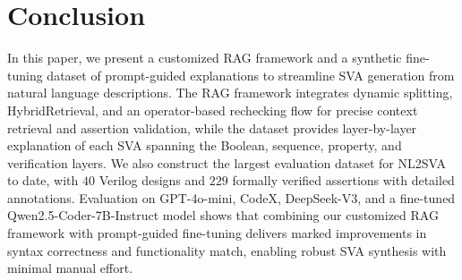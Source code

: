 \section{Conclusion} \label{sec:con}
In this paper, we present a customized RAG framework and a synthetic fine-tuning dataset of prompt-guided explanations to streamline SVA generation from natural language descriptions. The RAG framework integrates dynamic splitting, HybridRetrieval, and an operator-based rechecking flow for precise context retrieval and assertion validation, while the dataset provides layer-by-layer explanation of each SVA spanning the Boolean, sequence, property, and verification layers. 
We also construct the largest evaluation dataset for NL2SVA to date, with $40$ Verilog designs and $229$ formally verified assertions with detailed annotations.
Evaluation on GPT-4o-mini, CodeX, DeepSeek-V3, and a fine-tuned Qwen2.5-Coder-7B-Instruct model shows that combining our customized RAG framework with prompt-guided fine-tuning delivers marked improvements in syntax correctness and functionality match, enabling robust SVA synthesis with minimal manual effort.




